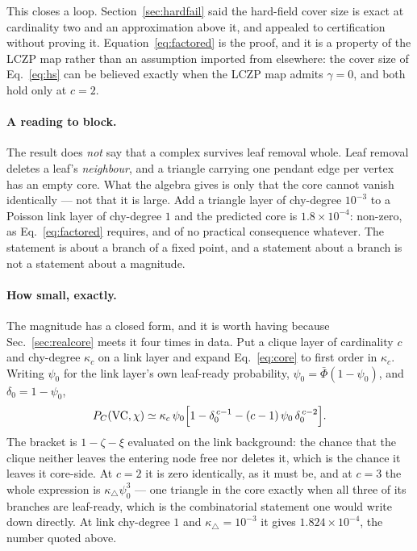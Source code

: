 This closes a loop. Section~\ref{sec:hardfail} said the hard-field cover size is
exact at cardinality two and an approximation above it, and appealed to
certification without proving it. Equation~\eqref{eq:factored} is the proof, and
it is a property of the LCZP map rather than an assumption imported from
elsewhere: the cover size of Eq.~\eqref{eq:hs} can be believed exactly when
the LCZP map admits $\gamma=0$, and both hold only at $c=2$.

\paragraph{A reading to block.} The result does \emph{not} say that a complex
survives leaf removal whole. Leaf removal deletes a leaf's \emph{neighbour}, and
a triangle carrying one pendant edge per vertex has an empty core. What the
algebra gives is only that the core cannot vanish identically --- not that it is
large. Add a triangle layer of chy-degree $10^{-3}$ to a Poisson link layer of
chy-degree $1$ and the predicted core is $1.8\times10^{-4}$: non-zero, as
Eq.~\eqref{eq:factored} requires, and of no practical consequence whatever. The
statement is about a branch of a fixed point, and a statement about a branch is
not a statement about a magnitude.

\paragraph{How small, exactly.} The magnitude has a closed form, and it is
worth having because Sec.~\ref{sec:realcore} meets it four times in data. Put a
clique layer of cardinality $c$ and chy-degree $\kappa_{c}$ on a link layer and
expand Eq.~\eqref{eq:core} to first order in $\kappa_{c}$. Writing $\psi_{0}$
for the link layer's own leaf-ready probability, $\psi_{0}=\bar\Phi(1-\psi_{0})$,
and $\delta_{0}=1-\psi_{0}$,
\begin{equation}
  P_{C}(\mathrm{VC},\chi)\simeq\kappa_{c}\,\psi_{0}
    \Bigl[1-\delta_{0}^{\,c-1}-(c-1)\,\psi_{0}\,\delta_{0}^{\,c-2}\Bigr].
  \label{eq:smallcore}
\end{equation}
The bracket is $1-\zeta-\xi$ evaluated on the link background: the chance that
the clique neither leaves the entering node free nor deletes it, which is the
chance it leaves it core-side. At $c=2$ it is zero identically, as it must be,
and at $c=3$ the whole expression is $\kappa_{\triangle}\psi_{0}^{3}$ --- one
triangle in the core exactly when all three of its branches are leaf-ready,
which is the combinatorial statement one would write down directly. At link
chy-degree $1$ and $\kappa_{\triangle}=10^{-3}$ it gives $1.824\times10^{-4}$,
the number quoted above.

